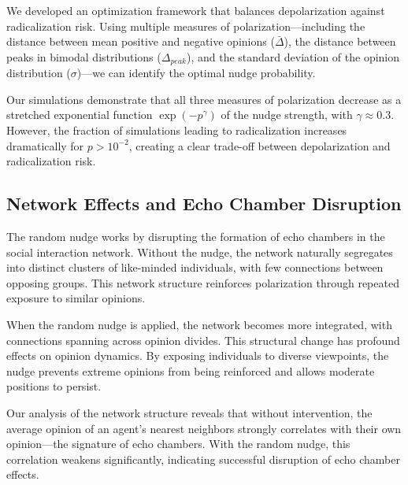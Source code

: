 We developed an optimization framework that balances depolarization against radicalization risk. Using multiple measures of polarization—including the distance between mean positive and negative opinions ($\bar{\Delta}$), the distance between peaks in bimodal distributions ($\Delta_{peak}$), and the standard deviation of the opinion distribution ($\sigma$)—we can identify the optimal nudge probability.

Our simulations demonstrate that all three measures of polarization decrease as a stretched exponential function $\exp(-p^\gamma)$ of the nudge strength, with $\gamma \approx 0.3$. However, the fraction of simulations leading to radicalization increases dramatically for $p > 10^{-2}$, creating a clear trade-off between depolarization and radicalization risk.


\subsection{Network Effects and Echo Chamber Disruption}

The random nudge works by disrupting the formation of echo chambers in the social interaction network. Without the nudge, the network naturally segregates into distinct clusters of like-minded individuals, with few connections between opposing groups. This network structure reinforces polarization through repeated exposure to similar opinions.

When the random nudge is applied, the network becomes more integrated, with connections spanning across opinion divides. This structural change has profound effects on opinion dynamics. By exposing individuals to diverse viewpoints, the nudge prevents extreme opinions from being reinforced and allows moderate positions to persist.

Our analysis of the network structure reveals that without intervention, the average opinion of an agent's nearest neighbors strongly correlates with their own opinion—the signature of echo chambers. With the random nudge, this correlation weakens significantly, indicating successful disruption of echo chamber effects.

